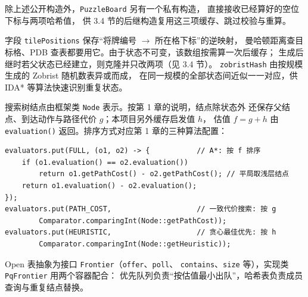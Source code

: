除上述公开构造外，\texttt{PuzzleBoard} 另有一个私有构造，
直接接收已经算好的空位下标与两项哈希值，
供 3.4 节的后继构造复用这三项缓存、跳过校验与重算。

字段 \texttt{tilePositions} 保存“将牌编号 $\to$ 所在格下标”的逆映射，
曼哈顿距离查目标格、PDB 查表都要用它。由于状态不可变，该数组按需算一次后缓存；
生成后继时若父状态已经建立，则克隆并只改两项（见 3.4 节）。
\texttt{zobristHash} 由按规模生成的 Zobrist 随机数表异或而成，
在同一规模的全部状态间近似一一对应，供 IDA* 等算法快速识别重复状态。

搜索树结点由框架类 \texttt{Node} 表示。按第 1 章的说明，结点除状态外
还保存父结点、到达动作与路径代价 $g$；本项目另外缓存启发值 $h$，
估值 $f=g+h$ 由 \texttt{evaluation()} 返回。排序方式对应第 1 章的三种算法配置：

{\fontsize{9.5bp}{12bp}\selectfont
\noindent\begin{minipage}{\linewidth}
\begin{verbatim}
evaluators.put(FULL, (o1, o2) -> {           // A*: 按 f 排序
    if (o1.evaluation() == o2.evaluation())
        return o1.getPathCost() - o2.getPathCost(); // 平局取浅层结点
    return o1.evaluation() - o2.evaluation();
});
evaluators.put(PATH_COST,                    // 一致代价搜索: 按 g
        Comparator.comparingInt(Node::getPathCost));
evaluators.put(HEURISTIC,                    // 贪心最佳优先: 按 h
        Comparator.comparingInt(Node::getHeuristic));
\end{verbatim}
\end{minipage}}

\par\vspace{2bp}

Open 表抽象为接口 \texttt{Frontier}（\texttt{offer}、\texttt{poll}、
\texttt{contains}、\texttt{size} 等），实现类 \texttt{PqFrontier} 用两个容器配合：
优先队列负责“按估值最小出队”，哈希表负责成员查询与重复结点替换。

